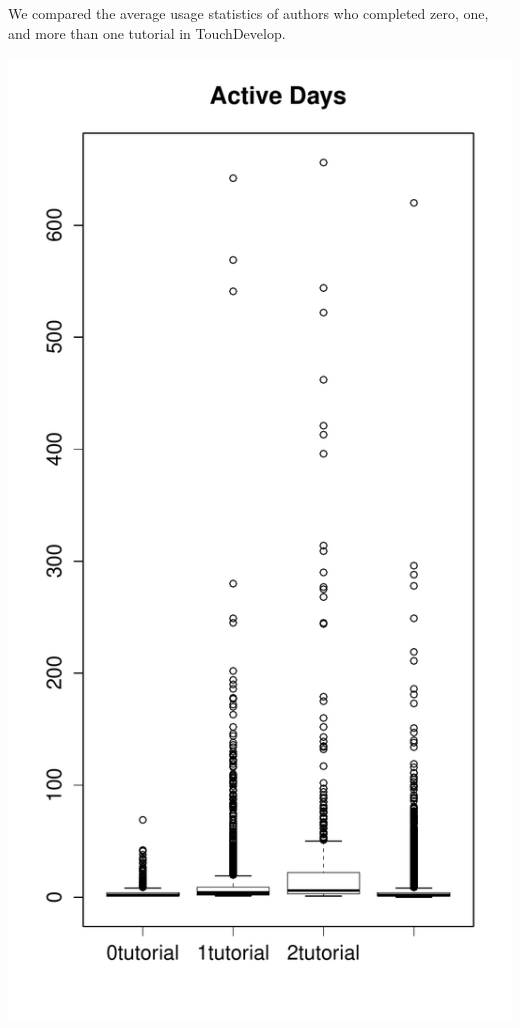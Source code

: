
\subsection{\rqengagement}

We compared the average usage statistics of authors who completed zero, one, and more than one tutorial in TouchDevelop.


\includegraphics[width=\columnwidth]{figures/preliminary/activedays_boxplot}
